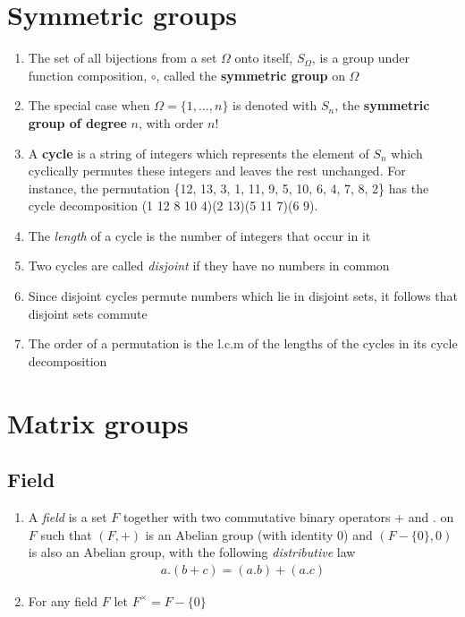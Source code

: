 \documentclass[titlepage, 12pt]{article}
\begin{document}
\section{Symmetric groups}

\begin{enumerate}

  \item The set of all bijections from a set $\Omega$ onto itself, $S_\Omega$,
    is a group under function composition, $\circ$, called the \textbf{symmetric
    group} on $\Omega$

  \item The special case when $\Omega = \{1,\dots,n\}$ is denoted with $S_n$,
    the \textbf{symmetric group of degree} $n$, with order $n!$

  \item A \textbf{cycle} is a string of integers which represents the element of
    $S_n$ which cyclically permutes these integers and leaves the rest
    unchanged. For instance, the permutation \{12, 13, 3, 1, 11, 9, 5, 10, 6, 4,
    7, 8, 2\} has the cycle decomposition (1 12 8 10 4)(2 13)(5 11 7)(6 9).

  \item The \textit{length} of a cycle is the number of integers that occur in
    it

  \item Two cycles are called \textit{disjoint} if they have no numbers in
    common

  \item Since disjoint cycles permute numbers which lie in disjoint sets, it
    follows that disjoint sets commute

  \item The order of a permutation is the l.c.m of the lengths of the cycles in
    its cycle decomposition

\end{enumerate}

\section{Matrix groups}
\subsection{Field}
\begin{enumerate}
  \item A \textit{field} is a set $F$ together with two commutative binary
    operators + and . on $F$ such that $(F, +)$ is an Abelian group (with
    identity 0) and $(F-\{0\}, 0)$ is also an Abelian group, with the following
    \textit{distributive} law
    \begin{gather*}
      a.(b+c) = (a.b)+(a.c)
    \end{gather*}
  \item For any field $F$ let $F^\times = F-\{0\}$
\end{enumerate}
\end{document}
